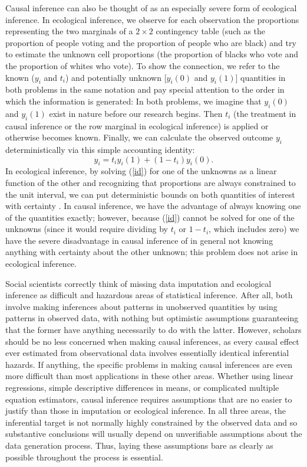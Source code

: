 \documentclass[11pt,titlepage]{article}
\begin{document}
Causal inference can also be thought of as an especially severe form
of ecological inference.  In ecological inference, we observe for each
observation the proportions representing the two marginals of a
$2\times 2$ contingency table (such as the proportion of people voting
and the proportion of people who are black) and try to estimate the
unknown cell proportions (the proportion of blacks who vote and the
proportion of whites who vote).  To show the connection, we refer to
the known ($y_i$ and $t_i$) and potentially unknown [$y_i(0)$ and
$y_i(1)$] quantities in both problems in the same notation and pay
special attention to the order in which the information is generated:
In both problems, we imagine that $y_i(0)$ and $y_i(1)$ exist in
nature before our research begins.  Then $t_i$ (the treatment in
causal inference or the row marginal in ecological inference) is
applied or otherwise becomes known.  Finally, we can calculate the
observed outcome $y_i$ deterministically via this simple accounting
identity:
\begin{equation}
  \label{id}
  y_i = t_iy_i(1) + (1-t_i)y_i(0).
\end{equation}
In ecological inference, by solving (\ref{id}) for one of the unknowns
as a linear function of the other and recognizing that proportions are
always constrained to the unit interval, we can put deterministic
bounds on both quantities of interest with certainty
\citep[][ch.5]{King97}.  In causal inference, we have the advantage of
always knowing one of the quantities exactly; however, because
(\ref{id}) cannot be solved for one of the unknowns (since it would
require dividing by $t_i$ or $1-t_i$, which includes zero) we have the
severe disadvantage in causal inference of in general not knowing
anything with certainty about the other unknown; this problem does not
arise in ecological inference.

Social scientists correctly think of missing data imputation and
ecological inference as difficult and hazardous areas of statistical
inference.  After all, both involve making inferences about patterns
in unobserved quantities by using patterns in observed data, with
nothing but optimistic assumptions guaranteeing that the former have
anything necessarily to do with the latter.  However, scholars should
be no less concerned when making causal inferences, as every causal
effect ever estimated from observational data involves essentially
identical inferential hazards.  If anything, the specific problems in
making causal inferences are even more difficult than most
applications in these other areas.  Whether using linear regressions,
simple descriptive differences in means, or complicated multiple
equation estimators, causal inference requires assumptions that are no
easier to justify than those in imputation or ecological inference.
In all three areas, the inferential target is not normally highly
constrained by the observed data and so substantive conclusions will
usually depend on unverifiable assumptions about the data generation
process.  Thus, laying these assumptions bare as clearly as possible
throughout the process is essential.
\end{document}
